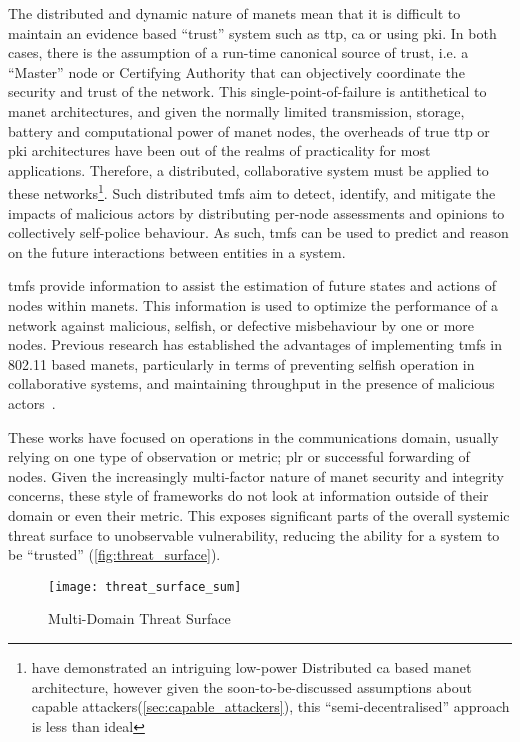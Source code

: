 The distributed and dynamic nature of \glspl{manet} mean that it is difficult to maintain an evidence based ``trust'' system such as \gls{ttp}, \gls{ca} or using \gls{pki}. 
In both cases, there is the assumption of a run-time canonical source of trust, i.e. a ``Master'' node or Certifying Authority that can objectively coordinate the security and trust of the network.
This single-point-of-failure is antithetical to \gls{manet} architectures, and given the normally limited transmission, storage, battery and computational power of \gls{manet} nodes, the overheads of true \gls{ttp} or \gls{pki} architectures have been out of the realms of practicality for most applications.
Therefore, a distributed, collaborative system must be applied to these networks\footnote{\citet{Zouridaki} have demonstrated an intriguing low-power Distributed \gls{ca} based \gls{manet} architecture, however given the soon-to-be-discussed assumptions about capable attackers(\autoref{sec:capable_attackers}), this ``semi-decentralised'' approach is less than ideal}.
Such distributed \glspl{tmf} aim to detect, identify, and mitigate the impacts of malicious actors by distributing per-node assessments and opinions to collectively self-police behaviour.
As such, \glspl{tmf} can be used to predict and reason on the future interactions between entities in a system.

\glspl{tmf} provide information to assist the estimation of future states and actions of nodes within \glspl{manet}.
This information is used to optimize the performance of a network against malicious, selfish, or defective misbehaviour by one or more nodes.
Previous research has established the advantages of implementing \glspl{tmf} in 802.11 based \glspl{manet}, particularly in terms of preventing selfish operation in collaborative systems, and maintaining throughput in the presence of malicious actors~\cite{Li2007, Buchegger2002}.

These works have focused on operations in the communications domain, usually relying on one type of observation or metric; \gls{plr} or successful forwarding of nodes.
Given the increasingly multi-factor nature of \gls{manet} security and integrity concerns, these style of frameworks do not look at information outside of their domain or even their metric. 
This exposes significant parts of the overall systemic threat surface to unobservable vulnerability, reducing the ability for a system to be ``trusted'' (\autoref{fig:threat_surface}).

\begin{figure}[h!]
	\centering
	\texttt{[image: threat\_surface\_sum]}
	\caption[Multi-Domain Threat Surface]{Multi-Domain Threat Surface}
	\label{fig:threat_surface}
\end{figure}


